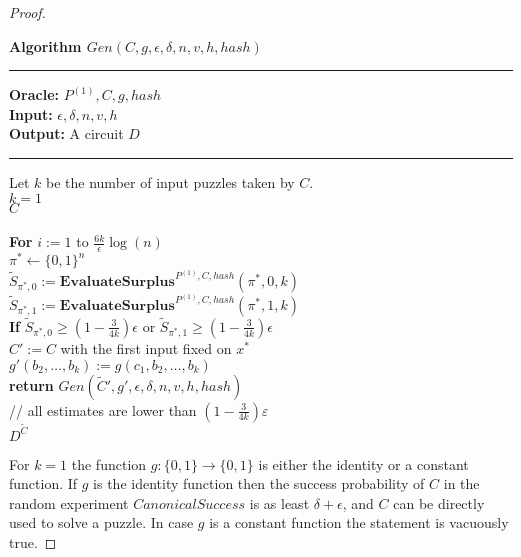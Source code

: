 \begin{proof}
\begin{codeblock}
\end{codeblock}
%
%
\begin{codeblock}
  \textbf{Algorithm $Gen(C, g, \epsilon, \delta, n, v, h, hash)$}
  \medskip
  \hrule
  \medskip
  \textbf{Oracle:} $ P^{(1)}, C, g, hash$ \\
  \textbf{Input:}  $\epsilon, \delta, n, v, h$\\
  \textbf{Output:} A circuit $D$
  \medskip\hrule\medskip
  Let $k$ be the number of input puzzles taken by $C$.\\
  \If $k = 1$ \then \\
  \IndI \return $C$ \\ \\
  \textbf{For} $i:=1$ to $\frac{6k}{\epsilon}\log(n)$ \\
  \IndI $\pi^* \leftarrow \{0,1\}^{n}$\\
  \IndI $\widetilde{S}_{\pi^*,0} := \textbf{EvaluateSurplus}^{P^{(1)}, C, hash}(\pi^*, 0, k)$\\
  \IndI $\widetilde{S}_{\pi^*,1} := \textbf{EvaluateSurplus}^{P^{(1)}, C, hash}(\pi^*, 1, k)$\\
  \IndI \textbf{If} $\widetilde{S}_{\pi^*,0} \geq (1 - \frac{3}{4k}) \epsilon$ or $\widetilde{S}_{\pi^*,1} \geq (1 - \frac{3}{4k}) \epsilon$ \\
  \IndII $C' := C$ with the first input fixed on $x^*$\\
  \IndII $g'(b_2, \dots, b_k) := g(c_1, b_2, \dots, b_k)$\\
  \IndII\textbf{return} $Gen(\widetilde{C}', g', \epsilon, \delta, n, v, h, hash)$ \\
  // all estimates are lower than $(1-\frac{3}{4k})\varepsilon$\\
  \return $D^{\widetilde{C}}$
\end{codeblock}
%
%
For $k=1$ the function $g: \{0,1\} \rightarrow \{0,1\}$ is either the identity or a constant function.
If $g$ is the identity function then the success probability of $C$ in the random experiment $CanonicalSuccess$ is as least $\delta + \epsilon$,
and $C$ can be directly used to solve a puzzle. In case $g$ is a constant function the statement is vacuously true.


\end{proof}
